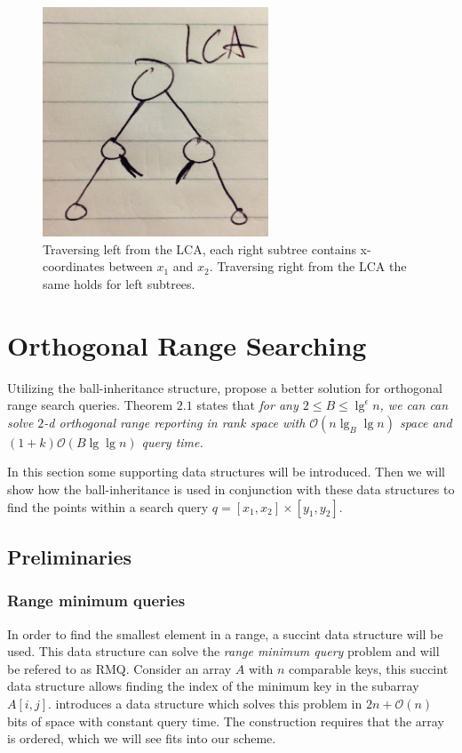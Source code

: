 \begin{figure}[H]
    \centering
    \includegraphics[width=0.6\textwidth]{pictures/LCA.png}
    \caption{Traversing left from the LCA, each right subtree contains x-coordinates between $x_1$ and $x_2$. Traversing right from the LCA the same holds for left subtrees.}
    \label{fig:LCA}
\end{figure}


\section{Orthogonal Range Searching}
\label{sect:original}
Utilizing the ball-inheritance structure, \citet{chanetal} propose a better solution for orthogonal range search queries. Theorem $2.1$ states that \emph{for any $2 \leq B \leq \lg^\epsilon n$, we can can solve $2$-d orthogonal range reporting in rank space with $\mathcal{O}(n \lg_B \lg n)$ space and $(1+k)\mathcal{O}(B \lg \lg n)$ query time.}

In this section some supporting data structures will be introduced. Then we will show how the ball-inheritance is used in conjunction with these data structures to find the points within a search query $q = [x_1, x_2] \times [y_1, y_2]$.

\subsection{Preliminaries}

\subsubsection{Range minimum queries}
In order to find the smallest element in a range, a succint data structure will be used. This data structure can solve the \emph{range minimum query} problem and will be refered to as RMQ. 
Consider an array $A$ with $n$ comparable keys, this succint data structure allows finding the index of the minimum key in the subarray $A[i,j]$. \citet{fischer} introduces a data structure which solves this problem in $2n + \mathcal{O}(n)$ bits of space with constant query time. The construction requires that the array is ordered, which we will see fits into our scheme.

